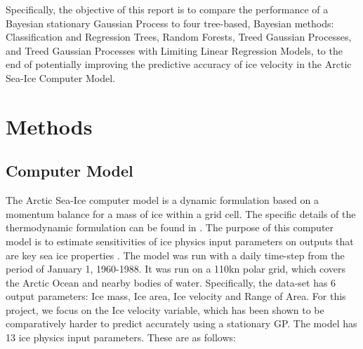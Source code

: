 \documentclass{article}\usepackage[]{graphicx}\usepackage[]{color}
\begin{document}
\vspace{1em}

Specifically, the objective of this report is to compare the performance of a Bayesian stationary Gaussian Process to four tree-based, Bayesian methods: Classification and Regression Trees, Random Forests, Treed Gaussian Processes, and Treed Gaussian Processes with Limiting Linear Regression Models, to the end of potentially improving the predictive accuracy of ice velocity in the Arctic Sea-Ice Computer Model.


\section*{Methods}

\subsection*{Computer Model}

The Arctic Sea-Ice computer model is a dynamic formulation based on a momentum balance for a mass of ice within a grid cell. The specific details of the thermodynamic formulation can be found in \cite{chapman_1994}. The purpose of this computer model is to estimate sensitivities of ice physics input parameters on outputs that are key sea ice properties \cite{chapman_1994}. The model was run with a daily time-step from the period of January 1, 1960-1988. It was run on a 110kn polar grid, which covers the Arctic Ocean and nearby bodies of water. Specifically, the data-set has 6 output parameters: Ice mass, Ice area, Ice velocity and Range of Area. For this project, we focus on the Ice velocity variable, which has been shown to be comparatively harder to predict accurately using a stationary GP. The model has 13 ice physics input parameters. These are as follows: 
\end{document}
